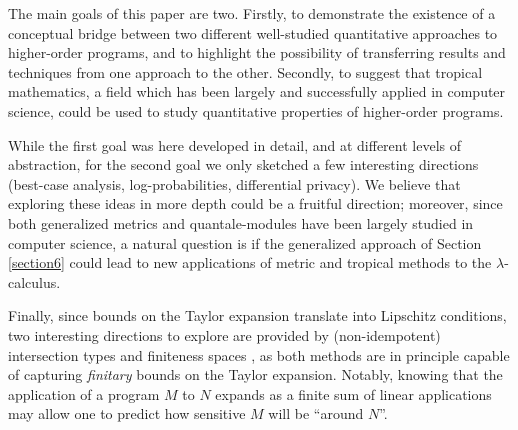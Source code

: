 


The main goals of this paper are two. Firstly,  to
demonstrate the existence of a conceptual bridge between two different well-studied quantitative approaches to higher-order programs, and to highlight the possibility of transferring results and techniques from one approach to the other. 
Secondly, to suggest that tropical mathematics, a
field which has been largely and successfully applied in computer science, could be used to study quantitative properties of higher-order programs.

While the first goal was here developed in detail, and at different levels of abstraction, for the second goal we only sketched a few interesting directions (best-case analysis, log-probabilities, differential privacy). We believe that exploring these ideas in more depth could be a fruitful direction; moreover, 
since both generalized metrics and quantale-modules have been largely studied in computer science, 
a natural question is if the generalized approach of Section \ref{section6} could  lead to new applications of metric and tropical methods to the $\lambda$-calculus.

Finally, since bounds on the Taylor expansion translate into Lipschitz conditions, 
 two interesting directions to explore are provided by (non-idempotent) intersection types and finiteness spaces \cite{Ehrhard2005}, as both methods are in principle capable of capturing \emph{finitary} bounds on the Taylor expansion. %
Notably, knowing that the application of a program $M$ to $N$ expands as a finite sum of linear applications may allow one to predict how sensitive $M$ will be ``around $N$''. 
%
%
%
%
%
%
%
%
%
